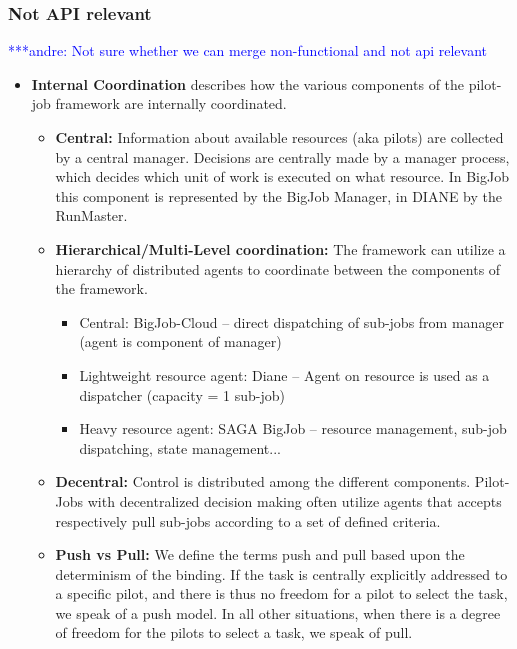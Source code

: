 \documentclass[conference,final]{IEEEtran}
\newcommand{\alnote}[1]{ {\textcolor{blue} { ***andre: #1 }}}
\newcommand{\alnote}[1]{}
\begin{document}
\subsubsection{Not API relevant}
\alnote{Not sure whether we can merge non-functional and not api relevant}

\begin{itemize}
\item \textbf{Internal Coordination} describes how the various components of the 
pilot-job framework are internally coordinated.
		\begin{itemize}
			\item \textbf{Central:} Information about available resources (aka 
			pilots) are collected by a central manager.  Decisions are centrally 
			made by a manager process, which decides which unit 
   		    of work  is executed on what resource. In BigJob 
 		    this component is  represented by the BigJob Manager, in DIANE 
 		    by the RunMaster.
 			 \item \textbf{Hierarchical/Multi-Level coordination:} The 
 			 framework can  utilize a hierarchy of distributed agents to 
 			 coordinate between the components of the framework. 
             \begin{itemize}
             	    \item Central: BigJob-Cloud -- direct dispatching of 
             	    sub-jobs from manager (agent is component of manager)
                     \item Lightweight resource agent: Diane -- Agent on 
                     resource is used as a dispatcher (capacity = 1 sub-job)
                     \item Heavy resource agent: SAGA BigJob -- resource 
                     management, sub-job dispatching, state management...
             \end{itemize}
			\item \textbf{Decentral:} Control is distributed among the 
			different components. Pilot-Jobs with decentralized decision 
			making often utilize agents that accepts respectively pull 
			sub-jobs according to a set of defined criteria.
			\item \textbf{Push vs Pull:} We define the terms push and pull 
    				based upon the determinism of the binding. If the task is 
    				centrally explicitly addressed to a specific pilot, and 
    				there is thus no freedom for a pilot to select the task, we 
    				speak of a push model. In all other situations, when there 
    				is a degree of freedom for the pilots to select a task, we 
    				speak of pull.
			

\end{itemize}
\end{itemize}
\end{document}
